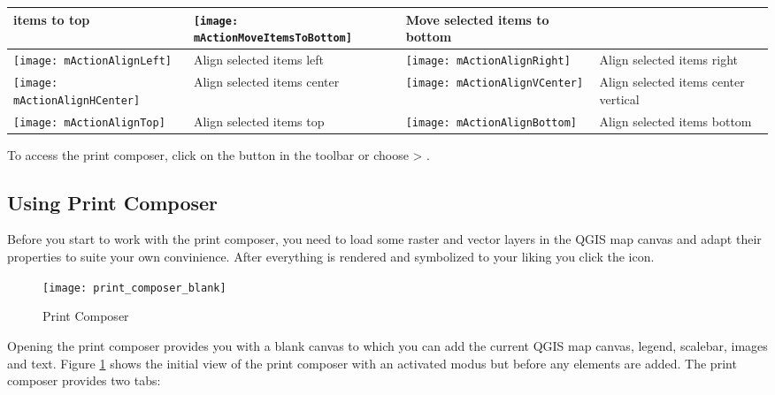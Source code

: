 \begin{table}[h]
\begin{tabular}{|l|p{6.9cm}|l|p{6.9cm}|}
 items to top & 
 \texttt{[image: mActionMoveItemsToBottom]} & Move selected
 items to bottom \\
 \hline \texttt{[image: mActionAlignLeft]} & Align selected 
 items left &
 \texttt{[image: mActionAlignRight]} & Align selected items 
 right \\
 \hline \texttt{[image: mActionAlignHCenter]} & Align selected 
 items center &
 \texttt{[image: mActionAlignVCenter]} & Align selected items
 center vertical \\
 \hline \texttt{[image: mActionAlignTop]} & Align selected
 items top &
 \texttt{[image: mActionAlignBottom]} & Align selected
 items bottom \\
\hline
\end{tabular}
\end{table}

To access the print composer, click on the 
button in the toolbar or choose  > .

\subsection{Using Print Composer}\label{label_useprintcomposer} 

Before you start to work with the print composer, you need to load some 
raster and vector layers in the QGIS map canvas and adapt their properties 
to suite your own convinience. After everything is rendered and symbolized to 
your liking you click the  icon.

\begin{figure}[ht]
   \begin{center}
   \caption{Print Composer \nixcaption}\label{fig:print_composer_blank}\smallskip
   \texttt{[image: print\_composer\_blank]}
\end{center}  
\end{figure}

Opening the print composer provides you with a blank canvas to which you can 
add the current QGIS map canvas, legend, scalebar, images and text. Figure
\ref{fig:print_composer_blank} shows the initial view of the print composer 
with an activated  modus but before any elements are
added. The print composer provides two tabs:


